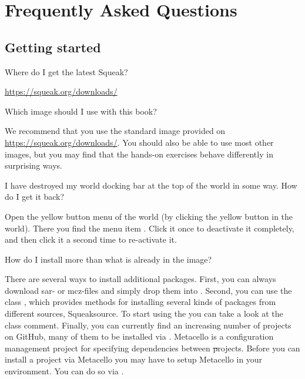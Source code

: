 \documentclass[a4paper,10pt,twoside]{book}
\begin{document}
	\renewcommand{\nnbb}[2]{} %
	\sloppy
\fi
\chapter{Frequently Asked Questions}
\label{app:faq}


\section{Getting started}
\begin{faq}
Where do I get the latest Squeak?
\end{faq}
\answer
\url{https://squeak.org/downloads/}

\begin{faq}
Which \sq image should I use with this book?
\end{faq}
\answer
We recommend that you use the standard image provided on \url{https://squeak.org/downloads/}.
You should also be able to use most other images, but you may find that the hands-on exercises behave differently in surprising ways.

\begin{faq}
I have destroyed my world docking bar at the top of the world in some way.
How do I get it back?
\end{faq}
\answer
Open the yellow button menu of the world (by clicking the yellow button in the world). 
There you find the menu item .
Click it once to deactivate it completely, and then click it a second time to re-activate it.

\begin{faq}
How do I install more than what is already in the image?
\end{faq}
\answer
There are several ways to install additional packages. 
First, you can always download sar- or mcz-files and simply drop them into \sq.
Second, you can use the class , which provides methods for installing several kinds of packages from different sources, \eg Squeaksource. 
To start using the  you can take a look at the class comment.
Finally, you can currently find an increasing number of \sq projects on GitHub, many of them to be installed via .
Metacello is a configuration management project for specifying dependencies between \st projects.
Before you can install a project via Metacello you may have to setup Metacello in your environment. 
You can do so via .
\end{document}
